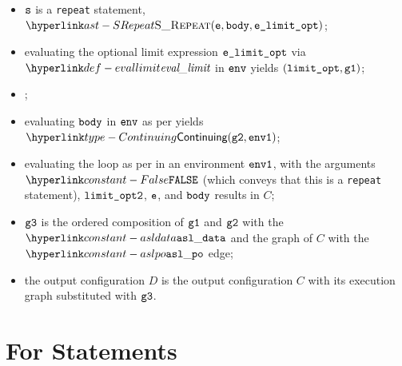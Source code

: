 \AllApply
\begin{itemize}
  \item $\vs$ is a \texttt{repeat} statement, $\SRepeat(\ve, \vbody, \velimitopt)$;
  \item evaluating the optional limit expression $\velimitopt$ via $\evallimit$ in $\env$
        yields $(\vlimitopt, \vgone)$\ProseOrDynErrorDiverging;
  \item \Proseticklooplimit{$\vlimitoptone$}{$\vlimitopttwo$}\ProseOrError;
  \item evaluating $\vbody$ in $\env$ as per 
        yields $\Continuing(\vgtwo, \envone)$\ProseTerminateAs{\ReturningConfig,\ThrowingConfig,\DynErrorConfig,\DivergingConfig};
  \item evaluating the loop as per  in an environment $\envone$,
        with the arguments $\False$ (which conveys that this is a \texttt{repeat} statement),
        $\vlimitopttwo$,
        $\ve$,
        and $\vbody$
        results in $C$;
  \item $\vgthree$ is the ordered composition of $\vgone$ and $\vgtwo$ with the $\asldata$ and the graph of $C$
        with the $\aslpo$ edge;
  \item the output configuration $D$ is the output configuration $C$ with its execution graph
        substituted with $\vgthree$.
\end{itemize}
\FormallyParagraph
\begin{mathpar}
\end{mathpar}

\section{For Statements\label{sec:ForStatements}}
\hypertarget{def-forstatementterm}{}


